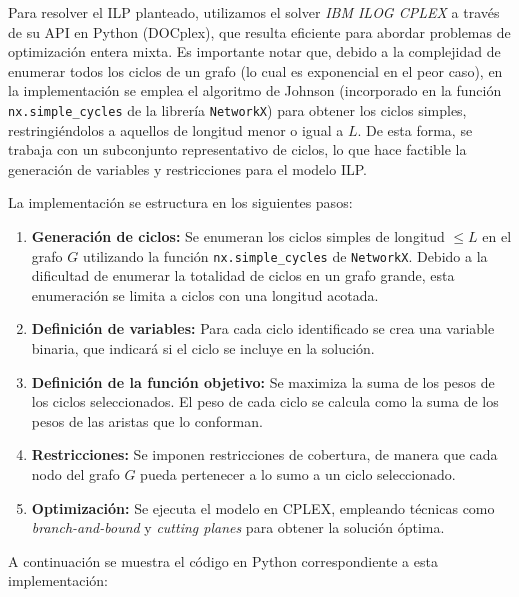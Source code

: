 \documentclass[twocolumn, fontsize=10pt]{article}
\theoremstyle{definition} %
\begin{document}
Para resolver el ILP planteado, utilizamos el solver \textit{IBM ILOG CPLEX} a través de su API en Python (DOCplex), que resulta eficiente para abordar problemas de optimización entera mixta. Es importante notar que, debido a la complejidad de enumerar todos los ciclos de un grafo (lo cual es exponencial en el peor caso), en la implementación se emplea el algoritmo de Johnson (incorporado en la función \texttt{nx.simple\_cycles} de la librería \texttt{NetworkX}) para obtener los ciclos simples, restringiéndolos a aquellos de longitud menor o igual a \(L\). De esta forma, se trabaja con un subconjunto representativo de ciclos, lo que hace factible la generación de variables y restricciones para el modelo ILP.

La implementación se estructura en los siguientes pasos:

\begin{enumerate}
    \item \textbf{Generación de ciclos:} Se enumeran los ciclos simples de longitud \( \leq L \) en el grafo \( G \) utilizando la función \texttt{nx.simple\_cycles} de \texttt{NetworkX}. Debido a la dificultad de enumerar la totalidad de ciclos en un grafo grande, esta enumeración se limita a ciclos con una longitud acotada.
    \item \textbf{Definición de variables:} Para cada ciclo identificado se crea una variable binaria, que indicará si el ciclo se incluye en la solución.
    \item \textbf{Definición de la función objetivo:} Se maximiza la suma de los pesos de los ciclos seleccionados. El peso de cada ciclo se calcula como la suma de los pesos de las aristas que lo conforman.
    \item \textbf{Restricciones:} Se imponen restricciones de cobertura, de manera que cada nodo del grafo \( G \) pueda pertenecer a lo sumo a un ciclo seleccionado.
    \item \textbf{Optimización:} Se ejecuta el modelo en CPLEX, empleando técnicas como \textit{branch-and-bound} y \textit{cutting planes} para obtener la solución óptima.
\end{enumerate}

A continuación se muestra el código en Python correspondiente a esta implementación:
\end{document}
